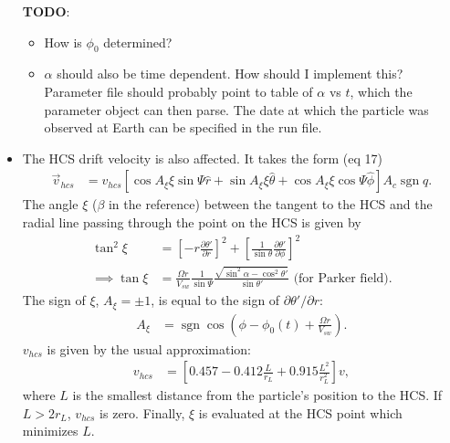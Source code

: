 \documentclass[11pt]{article}
\newcommand{\us}[1]{\text{ #1}} %
\renewcommand\d{\partial}
\newcommand{\sgn}{\operatorname{sgn}}
\begin{document}
\begin{itemize}
        \textbf{TODO}:
        \begin{itemize}
            \item
                How is $\phi_0$ determined?
            \item
                $\alpha$ should also be time dependent.  How should I implement this? Parameter file should probably point to table of $\alpha$ vs $t$, which the parameter object can then parse.  The date at which the particle was observed at Earth can be specified in the run file.
        \end{itemize}
    \item
        The HCS drift velocity is also affected.  It takes the form (eq 17)
        \begin{align*}
            \vec{v}_{hcs} &= v_{hcs} \left[ \cos A_\xi \xi \sin \Psi \hat{r} + \sin A_\xi \xi \hat{\theta} + \cos A_\xi \xi \cos\Psi \hat{\phi} \right] A_c \sgn q.
        \end{align*}
        The angle $\xi$ ($\beta$ in the reference) between the tangent to the HCS and the radial line passing through the point on the HCS is given by
        \begin{align*}
            \tan^2 \xi &= \left[ -r \frac{\d\theta'}{\d r} \right]^2 + \left[ \frac{1}{\sin\theta} \frac{\d \theta'}{\d\phi} \right]^2\\
            \implies \tan \xi &= \frac{\Omega r}{V_{sw}} \frac{1}{\sin \Psi} \frac{\sqrt{\sin^2\alpha - \cos^2\theta'}}{\sin\theta'} \us{(for Parker field)}.
        \end{align*}
        The sign of $\xi$, $A_\xi = \pm 1$, is equal to the sign of $\d\theta'/\d r$:
        \begin{align*}
            A_\xi &= \sgn \cos\left( \phi - \phi_0(t) + \frac{\Omega r}{V_{sw}} \right).
        \end{align*}
        $v_{hcs}$ is given by the usual approximation:
        \begin{align*}
            v_{hcs} &= \left[ 0.457 - 0.412 \frac{L}{r_L} + 0.915 \frac{L^2}{r_L^2} \right] v,
        \end{align*}
        where $L$ is the smallest distance from the particle's position to the HCS.  If $L > 2 r_L$, $v_{hcs}$ is zero.  Finally, $\xi$ is evaluated at the HCS point which minimizes $L$.
\end{itemize}
\end{document}
